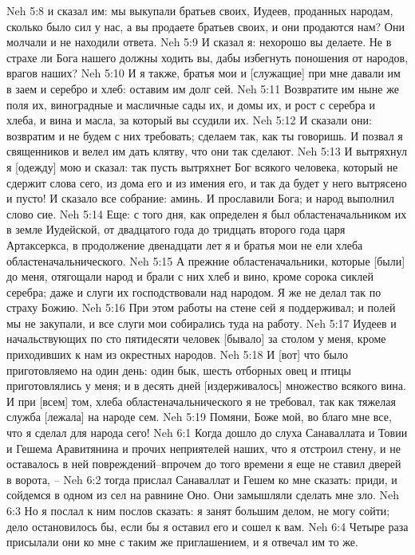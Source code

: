 Neh 5:8  и сказал им: мы выкупали братьев своих, Иудеев, проданных народам, сколько было сил у нас, а вы продаете братьев своих, и они продаются нам? Они молчали и не находили ответа.
Neh 5:9  И сказал я: нехорошо вы делаете. Не в страхе ли Бога нашего должны ходить вы, дабы избегнуть поношения от народов, врагов наших?
Neh 5:10  И я также, братья мои и [служащие] при мне давали им в заем и серебро и хлеб: оставим им долг сей.
Neh 5:11  Возвратите им ныне же поля их, виноградные и масличные сады их, и домы их, и рост с серебра и хлеба, и вина и масла, за который вы ссудили их.
Neh 5:12  И сказали они: возвратим и не будем с них требовать; сделаем так, как ты говоришь. И позвал я священников и велел им дать клятву, что они так сделают.
Neh 5:13  И вытряхнул я [одежду] мою и сказал: так пусть вытряхнет Бог всякого человека, который не сдержит слова сего, из дома его и из имения его, и так да будет у него вытрясено и пусто! И сказало все собрание: аминь. И прославили Бога; и народ выполнил слово сие.
Neh 5:14  Еще: с того дня, как определен я был областеначальником их в земле Иудейской, от двадцатого года до тридцать второго года царя Артаксеркса, в продолжение двенадцати лет я и братья мои не ели хлеба областеначальнического.
Neh 5:15  А прежние областеначальники, которые [были] до меня, отягощали народ и брали с них хлеб и вино, кроме сорока сиклей серебра; даже и слуги их господствовали над народом. Я же не делал так по страху Божию.
Neh 5:16  При этом работы на стене сей я поддерживал; и полей мы не закупали, и все слуги мои собирались туда на работу.
Neh 5:17  Иудеев и начальствующих по сто пятидесяти человек [бывало] за столом у меня, кроме приходивших к нам из окрестных народов.
Neh 5:18  И [вот] что было приготовляемо на один день: один бык, шесть отборных овец и птицы приготовлялись у меня; и в десять дней [издерживалось] множество всякого вина. И при [всем] том, хлеба областеначальнического я не требовал, так как тяжелая служба [лежала] на народе сем.
Neh 5:19  Помяни, Боже мой, во благо мне все, что я сделал для народа сего!
Neh 6:1  Когда дошло до слуха Санаваллата и Товии и Гешема Аравитянина и прочих неприятелей наших, что я отстроил стену, и не оставалось в ней повреждений--впрочем до того времени я еще не ставил дверей в ворота, --
Neh 6:2  тогда прислал Санаваллат и Гешем ко мне сказать: приди, и сойдемся в одном из сел на равнине Оно. Они замышляли сделать мне зло.
Neh 6:3  Но я послал к ним послов сказать: я занят большим делом, не могу сойти; дело остановилось бы, если бы я оставил его и сошел к вам.
Neh 6:4  Четыре раза присылали они ко мне с таким же приглашением, и я отвечал им то же.
